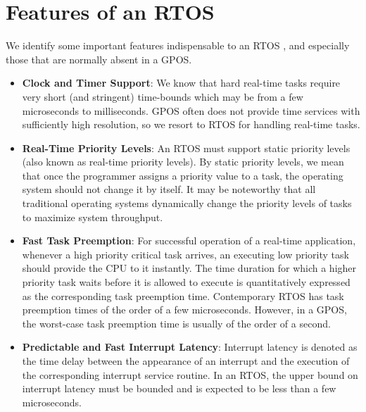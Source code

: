 \documentclass[12pt]{report}
\begin{document}
\section{Features of an RTOS}
We identify some important features indispensable to an RTOS \cite{NPTEL}, and especially those that are normally absent in a GPOS. 
\begin{itemize}
    \item \textbf{Clock and Timer Support}: We know that hard real-time tasks require very short (and stringent) time-bounds which may be from a few microseconds to milliseconds. GPOS often does not provide time services with sufficiently high resolution, so we resort to RTOS for handling real-time tasks. 
    \item \textbf{Real-Time Priority Levels}: An RTOS must support static priority levels (also known as real-time priority levels). By static priority levels, we mean that once the programmer assigns a priority value to a task, the operating system should not change it by itself. It may be noteworthy that all traditional operating systems dynamically change the priority levels of tasks to maximize system throughput. 
    \item \textbf{Fast Task Preemption}: For successful operation of a real-time application, whenever a high priority critical task arrives, an executing low priority task should provide the CPU to it instantly. The time duration for which a higher priority task waits before it is allowed to execute is quantitatively expressed as the corresponding task preemption time. Contemporary RTOS has task preemption times of the order of a few microseconds. However, in a GPOS, the worst-case task preemption time is usually of the order of a second. 
    \item \textbf{Predictable and Fast Interrupt Latency}: Interrupt latency is denoted as the time delay between the appearance of an interrupt and the execution of the corresponding interrupt service routine. In an RTOS, the upper bound on interrupt latency must be bounded and is expected to be less than a few microseconds.  
\end{itemize}
\end{document}
